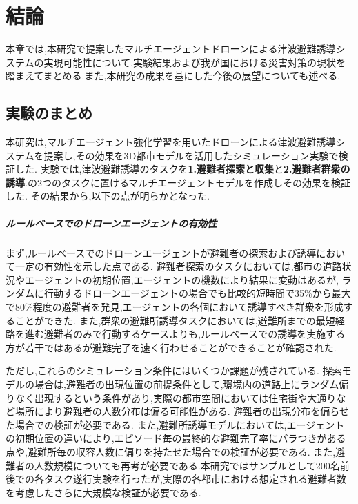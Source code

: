 \chapter{結論}
本章では,本研究で提案したマルチエージェントドローンによる津波避難誘導システムの実現可能性について,実験結果および我が国における災害対策の現状を踏まえてまとめる.また,本研究の成果を基にした今後の展望についても述べる.

\section{実験のまとめ}
本研究は,マルチエージェント強化学習を用いたドローンによる津波避難誘導システムを提案し,その効果を3D都市モデルを活用したシミュレーション実験で検証した.
実験では,津波避難誘導のタスクを\textbf{1.避難者探索と収集}と\textbf{2.避難者群衆の誘導}.の2つのタスクに置けるマルチエージェントモデルを作成しその効果を検証した.
その結果から,以下の点が明らかとなった.

\paragraph{ルールベースでのドローンエージェントの有効性}
まず,ルールベースでのドローンエージェントが避難者の探索および誘導において一定の有効性を示した点である.
避難者探索のタスクにおいては,都市の道路状況やエージェントの初期位置,エージェントの機数により結果に変動はあるが,
ランダムに行動するドローンエージェントの場合でも比較的短時間で35\%から最大で80\%程度の避難者を発見,エージェントの各個において誘導すべき群衆を形成することができた.
また,群衆の避難所誘導タスクにおいては,避難所までの最短経路を進む避難者のみで行動するケースよりも,ルールベースでの誘導を実施する方が若干ではあるが避難完了を速く行わせることができることが確認された.

ただし,これらのシミュレーション条件にはいくつか課題が残されている.
探索モデルの場合は,避難者の出現位置の前提条件として,環境内の道路上にランダム偏りなく出現するという条件があり,実際の都市空間においては住宅街や大通りなど場所により避難者の人数分布は偏る可能性がある.
避難者の出現分布を偏らせた場合での検証が必要である.
また,避難所誘導モデルにおいては,エージェントの初期位置の違いにより,エピソード毎の最終的な避難完了率にバラつきがある点や,避難所毎の収容人数に偏りを持たせた場合での検証が必要である.
また,避難者の人数規模についても再考が必要である.本研究ではサンプルとして200名前後での各タスク遂行実験を行ったが,実際の各都市における想定される避難者数を考慮したさらに大規模な検証が必要である.

